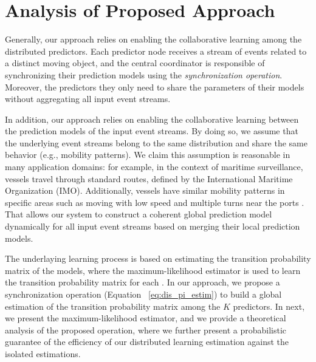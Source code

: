 \section{Analysis of Proposed Approach}

\par Generally, our approach relies on enabling the collaborative learning among the distributed predictors. Each predictor node receives a stream of events related to a distinct moving object, and the central coordinator is responsible of synchronizing their prediction models using the \textit{synchronization operation}. Moreover, the predictors they only need to share the parameters of their models without aggregating all input event streams. 

\par In addition, our approach relies on enabling the collaborative learning between the prediction models of the input event streams. By doing so, we assume that the underlying event streams belong to the same  distribution and share the same behavior (e.g., mobility patterns). We claim this assumption is reasonable in many application domains: for example, in the context of maritime surveillance, vessels travel through standard routes, defined by the International Maritime Organization (IMO). Additionally, vessels have similar mobility patterns in specific areas such as moving with low speed and multiple turns near the ports \cite{pallotta2013vessel,liu2014knowledge}. That allows our system to construct a coherent global prediction model dynamically for all input event streams based on merging their local prediction models.

\par The underlaying learning process is based on estimating the transition probability matrix of the \pmcmr models, where the maximum-likelihood estimator  \cite{anderson1957statistical} is used to learn the transition probability matrix for each \pmcmr. In our approach, we propose a synchronization operation (Equation ~\ref{eq:dis_pi_estim}) to build a global estimation of the transition probability matrix among the \emph{$K$} predictors. In next, we present the maximum-likelihood estimator, and we  provide a theoretical analysis of the proposed operation, where we further present a probabilistic guarantee of the efficiency of our distributed learning estimation against the isolated estimations.   


